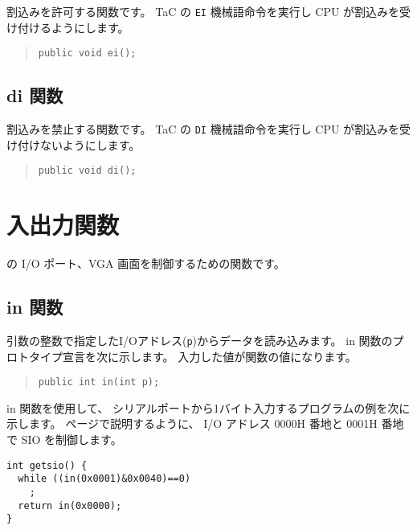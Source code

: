 割込みを許可する関数です。
TaC の \verb/EI/ 機械語命令を実行し
CPU が割込みを受け付けるようにします。

\begin{quote}
\begin{verbatim}
public void ei();
\end{verbatim}
\end{quote}

\subsection{di 関数}

割込みを禁止する関数です。
TaC の \verb/DI/ 機械語命令を実行し
CPU が割込みを受け付けないようにします。

\begin{quote}
\begin{verbatim}
public void di();
\end{verbatim}
\end{quote}

\section{入出力関数}

\tac の I/O ポート、VGA 画面を制御するための関数です。

\subsection{in 関数}

引数の整数で指定したI/Oアドレス(\verb/p/)からデータを読み込みます。
in 関数のプロトタイプ宣言を次に示します。
入力した値が関数の値になります。

\begin{quote}
\begin{verbatim}
public int in(int p);
\end{verbatim}
\end{quote}

in 関数を使用して、
シリアルポートから1バイト入力するプログラムの例を次に示します。
\pageref{app:sio}ページで説明するように、
I/O アドレス 0000H 番地と 0001H 番地で SIO を制御します。

\begin{mylist}
\begin{verbatim}
int getsio() {
  while ((in(0x0001)&0x0040)==0)
    ;
  return in(0x0000);
}
\end{verbatim}
\end{mylist}

